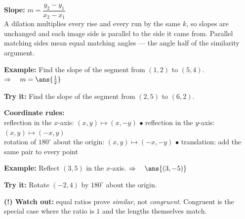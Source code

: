 \documentclass[12pt]{article}
\begin{document}

\begin{formulabox}
\textbf{Slope:} \quad $m = \dfrac{y_2 - y_1}{x_2 - x_1}$\\[3pt]
A dilation multiplies every rise and every run by the same $k$, so slopes are unchanged and each
image side is parallel to the side it came from. Parallel matching sides mean equal matching
angles --- the angle half of the similarity argument.
\end{formulabox}

\begin{examplebox}
\textbf{Example:} \quad Find the slope of the segment from $(1, 2)$ to $(5, 4)$.
$\Rightarrow\quad m = \ans{\tfrac{1}{2}}$
\end{examplebox}

\begin{tryitbox}
\textbf{Try it:} \quad Find the slope of the segment from $(2, 5)$ to $(6, 2)$.\\[2pt]
\end{tryitbox}


\begin{formulabox}
\textbf{Coordinate rules:}\\[3pt]
reflection in the $x$-axis: $(x, y) \mapsto (x, -y)$ \quad$\bullet$\quad
reflection in the $y$-axis: $(x, y) \mapsto (-x, y)$\\[2pt]
rotation of $180^\circ$ about the origin: $(x, y) \mapsto (-x, -y)$ \quad$\bullet$\quad
translation: add the same pair to every point
\end{formulabox}

\begin{examplebox}
\textbf{Example:} \quad Reflect $(3, 5)$ in the $x$-axis.
$\Rightarrow\quad \ans{(3, -5)}$
\end{examplebox}

\begin{tryitbox}
\textbf{Try it:} \quad Rotate $(-2, 4)$ by $180^\circ$ about the origin.\\[2pt]
\end{tryitbox}

\begin{watchoutbox}
\textbf{(!) Watch out:} equal ratios prove \textit{similar}, not \textit{congruent}. Congruent is
the special case where the ratio is $1$ and the lengths themselves match.
\end{watchoutbox}
\end{document}
